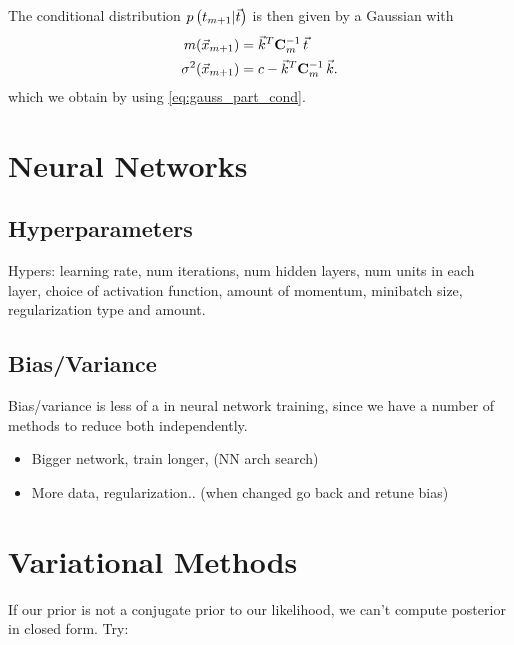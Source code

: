 \documentclass[11pt]{article}
\begin{document}
The conditional distribution $p\left( t_{m+1} | \vec{t} \right)$ is then given by a Gaussian with
\begin{align}
  m(\vec{x}_{m+1})         &= \vec{k}^T \mathbf{C}_m^{-1}\, \vec{t}\\
  \sigma^2 (\vec{x}_{m+1}) &= c - \vec{k}^T \mathbf{C}_m^{-1}\, \vec{k}.
\end{align}
which we obtain by using \eqref{eq:gauss_part_cond}. 



\section{Neural Networks}
\label{sec:nn}

\subsection{Hyperparameters}
Hypers: learning rate, num iterations, num hidden layers, num units in each layer,
choice of activation function, amount of momentum, minibatch size, regularization type
and amount.

\subsection{Bias/Variance}

Bias/variance is less of a  in neural network training, since we have a
number of methods to reduce both independently.
\begin{itemize}
  \item {} Bigger network, train longer, (NN arch
  search)
  \item {} More data, regularization.. (when changed
  go back and retune bias)
\end{itemize}


\section{Variational Methods}
\label{sec:var_meth}

If our prior is not a conjugate prior to our likelihood, we can't compute posterior in
closed form. Try:
\end{document}
